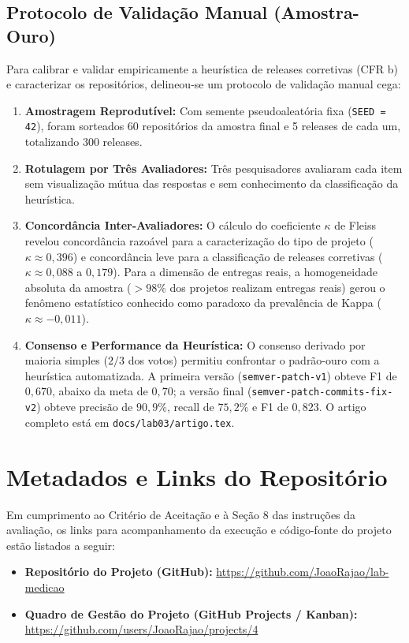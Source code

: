 \documentclass[12pt]{article}
\begin{document}
\subsection{Protocolo de Validação Manual (Amostra-Ouro)}
Para calibrar e validar empiricamente a heurística de releases corretivas (CFR b) e caracterizar os repositórios, delineou-se um protocolo de validação manual cega:
\begin{enumerate}
    \item \textbf{Amostragem Reprodutível:} Com semente pseudoaleatória fixa (\texttt{SEED = 42}), foram sorteados 60 repositórios da amostra final e 5 releases de cada um, totalizando 300 releases.
    \item \textbf{Rotulagem por Três Avaliadores:} Três pesquisadores avaliaram cada item sem visualização mútua das respostas e sem conhecimento da classificação da heurística.
    \item \textbf{Concordância Inter-Avaliadores:} O cálculo do coeficiente $\kappa$ de Fleiss revelou concordância razoável para a caracterização do tipo de projeto ($\kappa \approx 0{,}396$) e concordância leve para a classificação de releases corretivas ($\kappa \approx 0{,}088$ a $0{,}179$). Para a dimensão de entregas reais, a homogeneidade absoluta da amostra ($>98\%$ dos projetos realizam entregas reais) gerou o fenômeno estatístico conhecido como paradoxo da prevalência de Kappa ($\kappa \approx -0{,}011$).
    \item \textbf{Consenso e Performance da Heurística:} O consenso derivado por maioria simples ($2/3$ dos votos) permitiu confrontar o padrão-ouro com a heurística automatizada. A primeira versão (\texttt{semver-patch-v1}) obteve F1 de $0{,}670$, abaixo da meta de $0{,}70$; a versão final (\texttt{semver-patch-commits-fix-v2}) obteve precisão de $90{,}9\%$, recall de $75{,}2\%$ e F1 de $0{,}823$. O artigo completo está em \texttt{docs/lab03/artigo.tex}.
\end{enumerate}

\section{Metadados e Links do Repositório}

Em cumprimento ao Critério de Aceitação e à Seção 8 das instruções da avaliação, os links para acompanhamento da execução e código-fonte do projeto estão listados a seguir:

\begin{itemize}
    \item \textbf{Repositório do Projeto (GitHub):} \url{https://github.com/JoaoRajao/lab-medicao}
    \item \textbf{Quadro de Gestão do Projeto (GitHub Projects / Kanban):} \url{https://github.com/users/JoaoRajao/projects/4}
\end{itemize}
\end{document}
